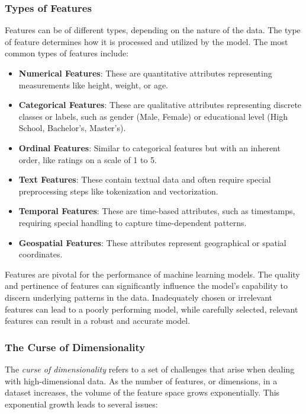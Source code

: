     \subsubsection{Types of Features}
    Features can be of different types, depending on the nature of the data. The type of feature determines how it is processed and utilized by the model. The most common types of features include:

    \begin{itemize}
        \item \textbf{Numerical Features}: These are quantitative attributes representing measurements like height, weight, or age.
        \item \textbf{Categorical Features}: These are qualitative attributes representing discrete classes or labels, such as gender (Male, Female) or educational level (High School, Bachelor's, Master's).
        \item \textbf{Ordinal Features}: Similar to categorical features but with an inherent order, like ratings on a scale of 1 to 5.
        \item \textbf{Text Features}: These contain textual data and often require special preprocessing steps like tokenization and vectorization.
        \item \textbf{Temporal Features}: These are time-based attributes, such as timestamps, requiring special handling to capture time-dependent patterns.
        \item \textbf{Geospatial Features}: These attributes represent geographical or spatial coordinates.
    \end{itemize}

    Features are pivotal for the performance of machine learning models. The quality and pertinence of features can significantly influence the model's capability to discern underlying patterns in the data. Inadequately chosen or irrelevant features can lead to a poorly performing model, while carefully selected, relevant features can result in a robust and accurate model.

    \subsubsection{The Curse of Dimensionality}
    The \textit{curse of dimensionality} refers to a set of challenges that arise when dealing with high-dimensional data. As the number of features, or dimensions, in a dataset increases, the volume of the feature space grows exponentially. This exponential growth leads to several issues:

